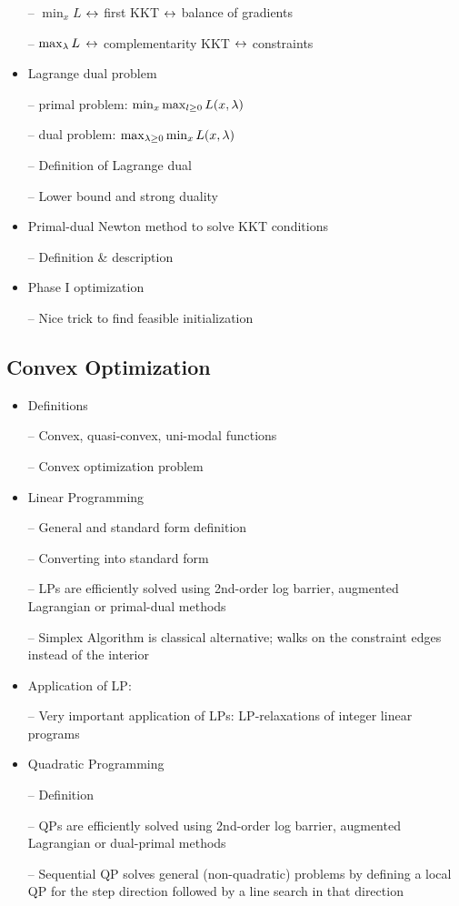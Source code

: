 \begin{itemize}
-- $\min_x L$ $\leftrightarrow$ first KKT $\leftrightarrow$ balance of gradients

-- $\max_\lambda L$ $\leftrightarrow$ complementarity KKT $\leftrightarrow$ constraints

\item Lagrange dual problem

-- primal problem: $\min_x \max_{l\ge 0} L(x,\lambda)$

-- dual problem: $\max_{\lambda\ge 0} \min_x L(x,\lambda)$

-- Definition of Lagrange dual

-- Lower bound and strong duality

\item Primal-dual Newton method to solve KKT conditions

-- Definition \& description

\item Phase I optimization

-- Nice trick to find feasible initialization

\end{itemize}


\subsection{Convex Optimization}

\begin{itemize}
\item Definitions

-- Convex, quasi-convex, uni-modal functions

-- Convex optimization problem

\item Linear Programming

-- General and standard form definition

-- Converting into standard form

-- LPs are efficiently solved using 2nd-order log barrier, augmented
Lagrangian or primal-dual methods

-- Simplex Algorithm is classical alternative; walks on the constraint
edges instead of the interior

\item Application of LP:

-- Very important application of LPs: LP-relaxations of integer linear
programs

\item Quadratic Programming

-- Definition

-- QPs are efficiently solved using 2nd-order log barrier, augmented
Lagrangian or dual-primal methods

-- Sequential QP solves general (non-quadratic) problems by defining a
local QP for the step direction followed by a line search in that
direction

\end{itemize}

